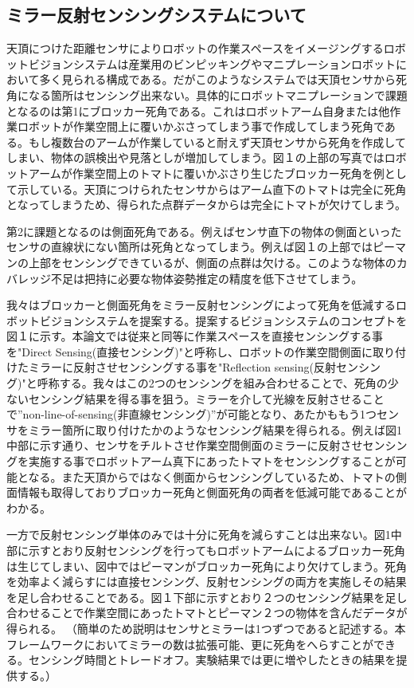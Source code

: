 \documentclass[xelatex,ja=standard]{bxjsarticle}
\begin{document}
\subsection{ミラー反射センシングシステムについて}
天頂につけた距離センサによりロボットの作業スペースをイメージングするロボットビジョンシステムは産業用のビンピッキングやマニプレーションロボットにおいて多く見られる構成である。だがこのようなシステムでは天頂センサから死角になる箇所はセンシング出来ない。具体的にロボットマニプレーションで課題となるのは第1にブロッカー死角である。これはロボットアーム自身または他作業ロボットが作業空間上に覆いかぶさってしまう事で作成してしまう死角である。もし複数台のアームが作業していると耐えず天頂センサから死角を作成してしまい、物体の誤検出や見落としが増加してしまう。図１の上部の写真ではロボットアームが作業空間上のトマトに覆いかぶさり生じたブロッカー死角を例として示している。天頂につけられたセンサからはアーム直下のトマトは完全に死角となってしまうため、得られた点群データからは完全にトマトが欠けてしまう。

第2に課題となるのは側面死角である。例えばセンサ直下の物体の側面といったセンサの直線状にない箇所は死角となってしまう。例えば図１の上部ではピーマンの上部をセンシングできているが、側面の点群は欠ける。このような物体のカバレッジ不足は把持に必要な物体姿勢推定の精度を低下させてしまう。

我々はブロッカーと側面死角をミラー反射センシングによって死角を低減するロボットビジョンシステムを提案する。提案するビジョンシステムのコンセプトを図１に示す。本論文では従来と同等に作業スペースを直接センシングする事を"Direct Sensing(直接センシング)"と呼称し、ロボットの作業空間側面に取り付けたミラーに反射させセンシングする事を"Reflection sensing(反射センシング)"と呼称する。我々はこの2つのセンシングを組み合わせることで、死角の少ないセンシング結果を得る事を狙う。ミラーを介して光線を反射させることで”non-line-of-sensing(非直線センシング)”が可能となり、あたかももう1つセンサをミラー箇所に取り付けたかのようなセンシング結果を得られる。例えば図1中部に示す通り、センサをチルトさせ作業空間側面のミラーに反射させセンシングを実施する事でロボットアーム真下にあったトマトをセンシングすることが可能となる。また天頂からではなく側面からセンシングしているため、トマトの側面情報も取得しておりブロッカー死角と側面死角の両者を低減可能であることがわかる。

一方で反射センシング単体のみでは十分に死角を減らすことは出来ない。図1中部に示すとおり反射センシングを行ってもロボットアームによるブロッカー死角は生じてしまい、図中ではピーマンがブロッカー死角により欠けてしまう。死角を効率よく減らすには直接センシング、反射センシングの両方を実施しその結果を足し合わせることである。図１下部に示すとおり２つのセンシング結果を足し合わせることで作業空間にあったトマトとピーマン２つの物体を含んだデータが得られる。
（簡単のため説明はセンサとミラーは1つずつであると記述する。本フレームワークにおいてミラーの数は拡張可能、更に死角をへらすことができる。センシング時間とトレードオフ。実験結果では更に増やしたときの結果を提供する。）
\end{document}
